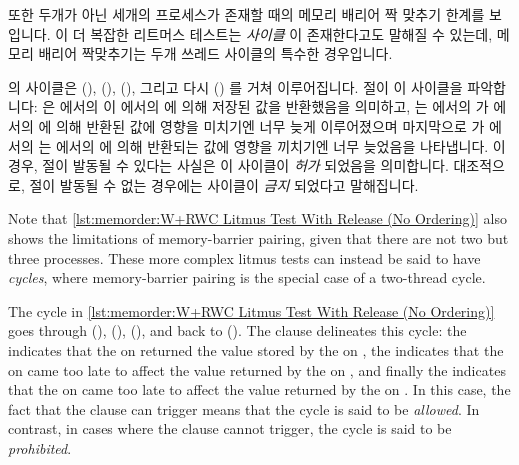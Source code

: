 또한 두개가 아닌 세개의 프로세스가 존재할 때의 메모리 배리어 짝 맞추기 한계를
보입니다.
이 더 복잡한 리트머스 테스트는 \emph{사이클} 이 존재한다고도 말해질 수 있는데,
메모리 배리어 짝맞추기는 두개 쓰레드 사이클의 특수한 경우입니다.
\begin{fcvref}
 의 사이클은
 (),  (), 
(), 그리고 다시  () 를 거쳐
이루어집니다.
 절이 이 사이클을 파악합니다:
 은  에서의  이 
에서의  에 의해 저장된 값을 반환했음을 의미하고,
 는  에서의  가  에서의
 에 의해 반환된 값에 영향을 미치기엔 너무 늦게 이루어졌으며
마지막으로  가  에서의  는
 에서의  에 의해 반환되는 값에 영향을 끼치기엔
너무 늦었음을 나타냅니다.
이 경우,  절이 발동될 수 있다는 사실은 이 사이클이 \emph{허가}
되었음을 의미합니다.
대조적으로,  절이 발동될 수 없는 경우에는 사이클이 \emph{금지}
되었다고 말해집니다.
\end{fcvref}

\iffalse

Note that
\cref{lst:memorder:W+RWC Litmus Test With Release (No Ordering)}
also shows the limitations of memory-barrier pairing, given that
there are not two but three processes.
These more complex litmus tests can instead be said to have \emph{cycles},
where memory-barrier pairing is the special case of a two-thread cycle.
\begin{fcvref}
The cycle in
\cref{lst:memorder:W+RWC Litmus Test With Release (No Ordering)}
goes through  (),  (),
 (), and back to  ().
The  clause delineates this cycle:
the  indicates that the  on 
returned the value stored by the  on ,
the  indicates that the  on  came
too late to affect the value returned by the  on ,
and finally the  indicates that the
 on  came too late to affect the value returned
by the  on .
In this case, the fact that the  clause can trigger means that
the cycle is said to be \emph{allowed}.
In contrast, in cases where the  clause cannot trigger,
the cycle is said to be \emph{prohibited}.
\end{fcvref}

